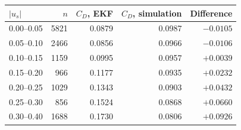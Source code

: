 \begin{tabular}{lrrrr}
\toprule
$|u_s|$ & $n$ & $C_D$, EKF & $C_D$, simulation & Difference \\
\midrule
0.00--0.05 & 5821 & 0.0879 & 0.0987 & $-0.0105$ \\
0.05--0.10 & 2466 & 0.0856 & 0.0966 & $-0.0106$ \\
0.10--0.15 & 1159 & 0.0995 & 0.0957 & $+0.0039$ \\
0.15--0.20 & 966 & 0.1177 & 0.0935 & $+0.0232$ \\
0.20--0.25 & 1029 & 0.1343 & 0.0903 & $+0.0432$ \\
0.25--0.30 & 856 & 0.1524 & 0.0868 & $+0.0660$ \\
0.30--0.40 & 1688 & 0.1730 & 0.0806 & $+0.0926$ \\
\bottomrule
\end{tabular}
